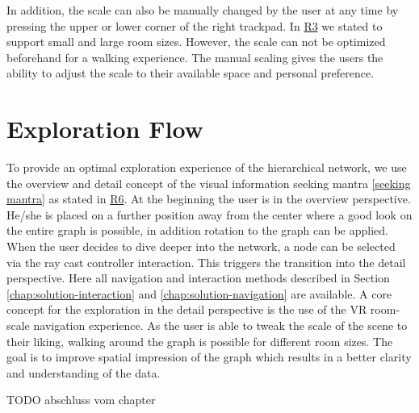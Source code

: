 In addition, the scale can also be manually changed by the user at any time by pressing the upper or lower corner of the right trackpad. 
In \hyperref[req:R3]{R3} we stated to support small and large room sizes.  However, the scale can not be optimized beforehand for a walking experience. The manual scaling gives the users the ability to adjust the scale to their available space and personal preference.
\section{Exploration Flow}
\label{chap:ps-explorationFlow}
To provide an optimal exploration experience of the hierarchical network, we use the overview and detail concept of the visual information seeking mantra \ref{seeking mantra} as stated in \hyperref[req:R6]{R6}. 
At the beginning the user is in the overview perspective. He/she is placed on a further position away from the center where a good look on the entire graph is possible, in addition rotation to the graph can be applied.
When the user decides to dive deeper into the network, a node can be selected via the ray cast controller interaction. This triggers the transition into the detail perspective. 
Here all navigation and interaction methods described in Section \ref{chap:solution-interaction} and \ref{chap:solution-navigation}
are available. 
A core concept for the exploration in the detail perspective is the use of the VR room-scale navigation experience. As the user is able to tweak the scale of the scene to their liking, walking around the graph is possible for different room sizes. The goal is to improve spatial impression of the graph which results in a better clarity and understanding of the data.

TODO abschluss vom chapter